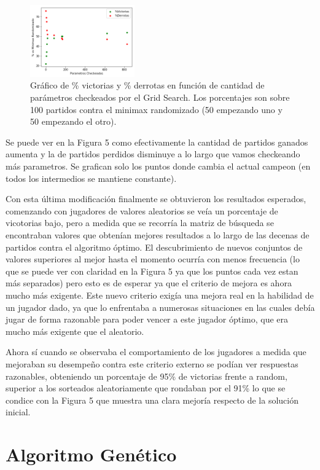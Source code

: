 \documentclass[A4paper,oneside,fleqn,11pt]{article}
\theoremstyle{definition}
\begin{document}
\begin{figure}
	\includegraphics[width=0.4\textwidth]{GridBack.png}
	\caption{ Gráfico de \% victorias y \% derrotas en función de cantidad de parámetros checkeados por el Grid Search. Los porcentajes son sobre 100 partidos contra el minimax randomizado (50 empezando uno y 50 empezando el otro).}
\end{figure}


Se puede ver en la Figura 5 como efectivamente la cantidad de partidos ganados aumenta y la de partidos perdidos disminuye a lo largo que vamos checkeando más parametros. Se grafican solo los puntos donde cambia el actual campeon (en todos los intermedios se mantiene constante).

Con esta última modificación finalmente se obtuvieron los resultados esperados, comenzando con jugadores de valores aleatorios se veía un porcentaje de vicotorias bajo, pero a medida que se recorría la matriz de búsqueda se encontraban valores que obtenían mejores resultados a lo largo de las decenas de partidos contra el algoritmo óptimo. El descubrimiento de nuevos conjuntos de valores superiores al mejor hasta el momento ocurría con menos frecuencia (lo que se puede ver con claridad en la Figura 5 ya que los puntos cada vez estan más separados) pero esto es de esperar ya que el criterio de mejora es ahora mucho más exigente. Este nuevo criterio exigía una mejora real en la habilidad de un jugador dado, ya que lo enfrentaba a numerosas situaciones en las cuales debía jugar de forma razonable para poder vencer a este jugador óptimo, que era mucho más exigente que el aleatorio. 


Ahora sí cuando se observaba el comportamiento de los jugadores a medida que mejoraban su desempeño contra este criterio externo se podían ver respuestas razonables, obteniendo un porcentaje de 95\% de victorias frente a random, superior a los sorteados aleatoriamente que rondaban por el 91\% lo que se condice con la Figura 5 que muestra una clara mejoría respecto de la solución inicial.


\section{Algoritmo Genético}
\end{document}
